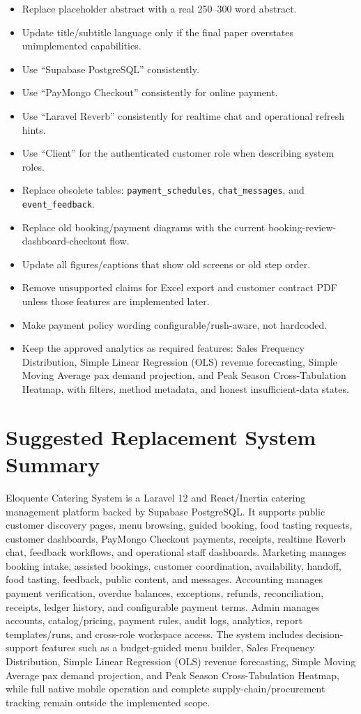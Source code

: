 \documentclass[11pt]{article}
\begin{document}
\begin{itemize}
    \item Replace placeholder abstract with a real 250--300 word abstract.
    \item Update title/subtitle language only if the final paper overstates unimplemented capabilities.
    \item Use ``Supabase PostgreSQL'' consistently.
    \item Use ``PayMongo Checkout'' consistently for online payment.
    \item Use ``Laravel Reverb'' consistently for realtime chat and operational refresh hints.
    \item Use ``Client'' for the authenticated customer role when describing system roles.
    \item Replace obsolete tables: \texttt{payment\_schedules}, \texttt{chat\_messages}, and \texttt{event\_feedback}.
    \item Replace old booking/payment diagrams with the current booking-review-dashboard-checkout flow.
    \item Update all figures/captions that show old screens or old step order.
    \item Remove unsupported claims for Excel export and customer contract PDF unless those features are implemented later.
    \item Make payment policy wording configurable/rush-aware, not hardcoded.
    \item Keep the approved analytics as required features: Sales Frequency Distribution, Simple Linear Regression (OLS) revenue forecasting, Simple Moving Average pax demand projection, and Peak Season Cross-Tabulation Heatmap, with filters, method metadata, and honest insufficient-data states.
\end{itemize}

\section*{Suggested Replacement System Summary}

Eloquente Catering System is a Laravel 12 and React/Inertia catering management platform backed by Supabase PostgreSQL. It supports public customer discovery pages, menu browsing, guided booking, food tasting requests, customer dashboards, PayMongo Checkout payments, receipts, realtime Reverb chat, feedback workflows, and operational staff dashboards. Marketing manages booking intake, assisted bookings, customer coordination, availability, handoff, food tasting, feedback, public content, and messages. Accounting manages payment verification, overdue balances, exceptions, refunds, reconciliation, receipts, ledger history, and configurable payment terms. Admin manages accounts, catalog/pricing, payment rules, audit logs, analytics, report templates/runs, and cross-role workspace access. The system includes decision-support features such as a budget-guided menu builder, Sales Frequency Distribution, Simple Linear Regression (OLS) revenue forecasting, Simple Moving Average pax demand projection, and Peak Season Cross-Tabulation Heatmap, while full native mobile operation and complete supply-chain/procurement tracking remain outside the implemented scope.
\end{document}
